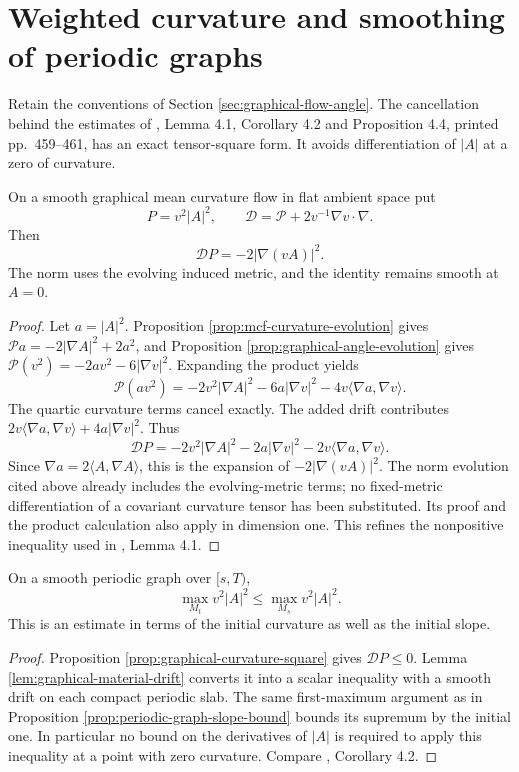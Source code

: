 \chapter{Weighted curvature and smoothing of periodic graphs}\label{sec:graphical-weighted-curvature}
Retain the conventions of Section \ref{sec:graphical-flow-angle}. The cancellation behind the estimates of \cite{EH89}, Lemma 4.1, Corollary 4.2 and Proposition 4.4, printed pp.~459--461, has an exact tensor-square form. It avoids differentiation of $|A|$ at a zero of curvature.

\begin{proposition}\label{prop:graphical-curvature-square}
On a smooth graphical mean curvature flow in flat ambient space put
\[
 P=v^2|A|^2,\qquad
 \mathcal D=\mathcal P+2v^{-1}\nabla v\cdot\nabla.
\]
Then
\[
 \mathcal DP=-2|\nabla(vA)|^2.
\]
The norm uses the evolving induced metric, and the identity remains smooth at $A=0$.
\end{proposition}
\begin{proof}
Let $a=|A|^2$. Proposition \ref{prop:mcf-curvature-evolution} gives $\mathcal Pa=-2|\nabla A|^2+2a^2$, and Proposition \ref{prop:graphical-angle-evolution} gives $\mathcal P(v^2)=-2av^2-6|\nabla v|^2$. Expanding the product yields
\[
 \mathcal P(av^2)=-2v^2|\nabla A|^2-6a|\nabla v|^2
                 -4v\langle\nabla a,\nabla v\rangle.
\]
The quartic curvature terms cancel exactly. The added drift contributes $2v\langle\nabla a,\nabla v\rangle+4a|\nabla v|^2$. Thus
\[
 \mathcal DP=-2v^2|\nabla A|^2-2a|\nabla v|^2
              -2v\langle\nabla a,\nabla v\rangle.
\]
Since $\nabla a=2\langle A,\nabla A\rangle$, this is the expansion of $-2|\nabla(vA)|^2$. The norm evolution cited above already includes the evolving-metric terms; no fixed-metric differentiation of a covariant curvature tensor has been substituted. Its proof and the product calculation also apply in dimension one. This refines the nonpositive inequality used in \cite{EH89}, Lemma 4.1.
\end{proof}

\begin{corollary}\label{cor:periodic-weighted-curvature-bound}
On a smooth periodic graph over $[s,T)$,
\[
 \max_{M_t}v^2|A|^2\leq\max_{M_s}v^2|A|^2.
\]
This is an estimate in terms of the initial curvature as well as the initial slope.
\end{corollary}
\begin{proof}
Proposition \ref{prop:graphical-curvature-square} gives $\mathcal DP\leq0$. Lemma \ref{lem:graphical-material-drift} converts it into a scalar inequality with a smooth drift on each compact periodic slab. The same first-maximum argument as in Proposition \ref{prop:periodic-graph-slope-bound} bounds its supremum by the initial one. In particular no bound on the derivatives of $|A|$ is required to apply this inequality at a point with zero curvature. Compare \cite{EH89}, Corollary 4.2.
\end{proof}

